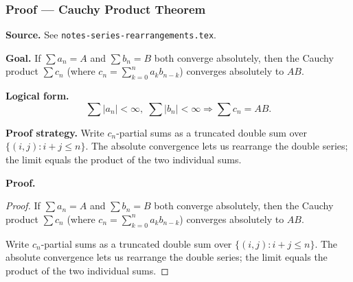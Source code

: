 

\clearpage
{}
\hypertarget{proof-RA-ABB-T-cauchy-product}{}

\subsubsection[Cauchy Product Theorem]{Proof --- Cauchy Product Theorem}

\bigskip

\noindent
\textbf{Source.} See \texttt{notes-series-rearrangements.tex}.

\vspace{0.75em}

\noindent
\textbf{Goal.} If $\sum a_n = A$ and $\sum b_n = B$ both converge absolutely, then the Cauchy product $\sum c_n$ (where $c_n = \sum_{k=0}^n a_k b_{n-k}$) converges absolutely to $AB$.

\vspace{0.75em}

\noindent
\textbf{Logical form.}
\[
  \sum |a_n| < \infty,\; \sum |b_n| < \infty \Rightarrow \sum c_n = AB.
\]

\vspace{0.75em}

\noindent
\textbf{Proof strategy.} Write $c_n$-partial sums as a truncated double sum over $\{(i,j) : i+j \le n\}$. The absolute convergence lets us rearrange the double series; the limit equals the product of the two individual sums.

\vspace{0.75em}

\noindent
\textbf{Proof.}
\begin{proof}
\Claim If $\sum a_n = A$ and $\sum b_n = B$ both converge absolutely, then the Cauchy product $\sum c_n$ (where $c_n = \sum_{k=0}^n a_k b_{n-k}$) converges absolutely to $AB$.

\Given 

\Goal 

\Strategy Write $c_n$-partial sums as a truncated double sum over $\{(i,j) : i+j \le n\}$. The absolute convergence lets us rearrange the double series; the limit equals the product of the two individual sums.

\medskip


\end{proof}

